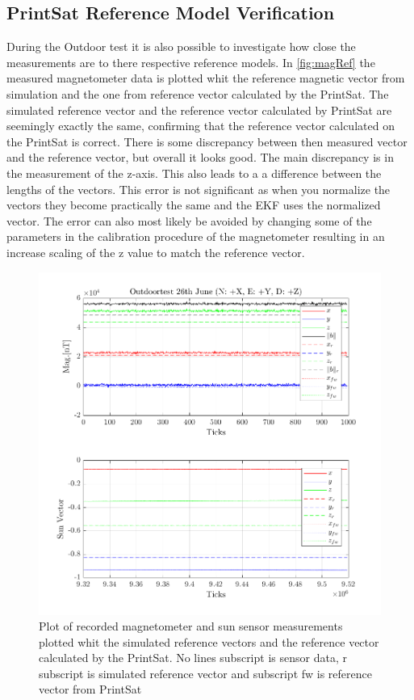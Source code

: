 \subsection{PrintSat Reference Model Verification}
During the Outdoor test it is also possible to investigate how close the measurements are to there respective reference models. In \autoref{fig:magRef} the measured magnetometer data is plotted whit the reference magnetic vector from simulation and the one from reference vector calculated by the PrintSat. The simulated reference vector and the reference vector calculated by PrintSat are seemingly exactly the same, confirming that the reference vector calculated on the PrintSat is correct. There is some discrepancy between then measured vector and the reference vector, but overall it looks good. The main discrepancy is in the measurement of the z-axis. This also leads to a a difference between the lengths of the vectors. This error is not significant as when you normalize the vectors they become practically the same and the EKF uses the normalized vector. The error can also most likely be avoided by changing some of the parameters in the calibration procedure of the magnetometer resulting in an increase scaling of the z value to match the reference vector.           

\begin{figure}[tbp]
	\centering
	\includegraphics[width=0.8\columnwidth]{./Pictures/outdoor4}
	\caption{Plot of recorded magnetometer and sun sensor measurements plotted whit the simulated reference vectors and the reference vector calculated by the PrintSat. No lines subscript is sensor data, r subscript is simulated reference vector and subscript fw is reference vector from PrintSat}
	\label{fig:magRef}
\end{figure}

